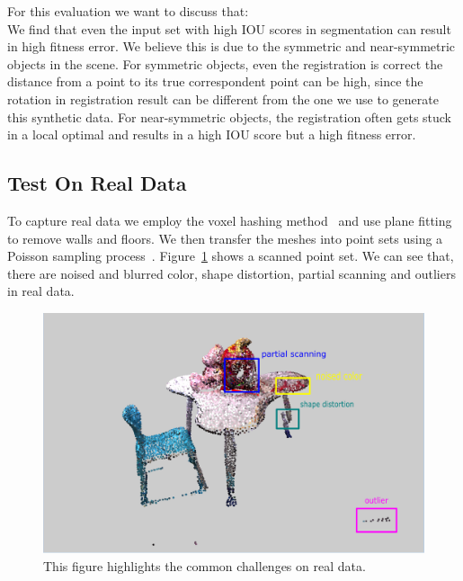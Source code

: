 For this evaluation we want to discuss that:\\
We find that even the input set with high IOU scores in segmentation can result in high fitness error. We believe this is due to the symmetric and near-symmetric objects in the scene. For symmetric objects, even the registration is correct the distance from a point to its true correspondent point can be high, since the rotation in registration result can be different from the one we use to generate this synthetic data. For near-symmetric objects, the registration often gets stuck in a local optimal and results in a high IOU score but a high fitness error.


\subsection{Test On Real Data}


To capture real data we employ the voxel hashing method~\cite{VXH} and use plane fitting to remove walls and floors. 
We then transfer the meshes into point sets using a Poisson sampling process~\cite{PossionSampling}.
Figure~\ref{fig:challenge} shows a scanned point set. We can see that, there are noised and blurred color, shape distortion, partial scanning and outliers in real data.
%
\begin{figure}
	\centering
	\includegraphics[width=\linewidth]{images/challenge/challenge}
	\caption{\label{fig:challenge}This figure highlights the common challenges on real data.}
\end{figure}




